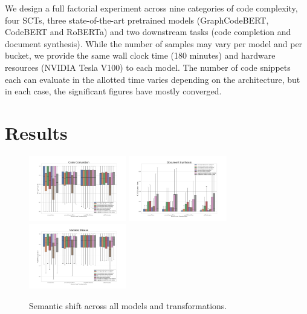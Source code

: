 \documentclass[usenames,dvipsnames]{article} %
\begin{document}
  We design a full factorial experiment across nine categories of code complexity, four SCTs, three state-of-the-art pretrained models (GraphCodeBERT, CodeBERT and RoBERTa) and two downstream tasks (code completion and document synthesis). While the number of samples may vary per model and per bucket, we provide the same wall clock time (180 minutes) and hardware resources (NVIDIA Tesla V100) to each model. The number of code snippets each can evaluate in the allotted time varies depending on the architecture, but in each case, the significant figures have mostly converged.

  \section{Results}\label{sec:results}

  \vspace{-10pt}\begin{figure}[H]
                  \centering\hspace*{-0.6cm}
                  \includegraphics[width=0.38\textwidth]{figs/Code Completion}\hspace*{-0.6cm}
                  \includegraphics[width=0.38\textwidth]{figs/Document Synthesis}\hspace*{-0.6cm}
                  \includegraphics[width=0.38\textwidth]{figs/Variable Misuse}
                  \caption{Semantic shift across all models and transformations.}
                  \label{fig:dataflow}
  \end{figure}
\end{document}
